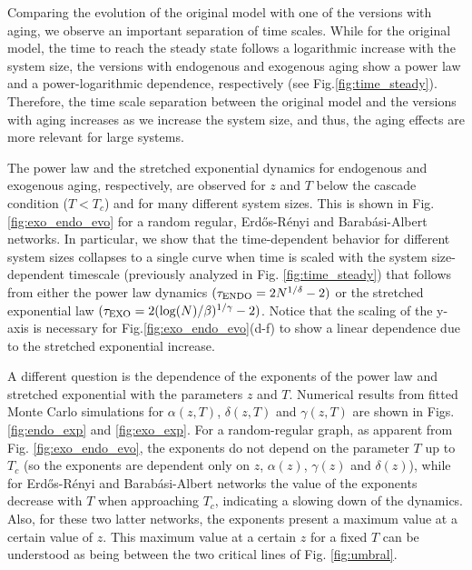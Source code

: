 Comparing the evolution of the original model with one of the versions with aging, we observe an important separation of time scales. While for the original model, the time to reach the steady state follows a logarithmic increase with the system size, the versions with endogenous and exogenous aging show a power law and a power-logarithmic dependence, respectively (see Fig.\ref{fig:time_steady}). Therefore, the time scale separation between the original model and the versions with aging increases as we increase the system size, and thus, the aging effects are more relevant for large systems.

The power law and the stretched exponential dynamics for endogenous and exogenous aging, respectively, are observed for $z$ and $T$ below the cascade condition ($T < T_c$) and for many different system sizes. This is shown in Fig. \ref{fig:exo_endo_evo} for a random regular, Erd\H{o}s-R\'enyi and  Barab\'asi-Albert networks. In particular, we show that the time-dependent behavior for different system sizes collapses to a single curve when time is scaled with the system size-dependent timescale (previously analyzed in Fig. \ref{fig:time_steady}) that follows from either the power law dynamics $(\tau_{\rm{ENDO}} = 2N^{1/\delta} - 2)$  or the stretched exponential law  $(\tau_{\rm{EXO}} = 2( \log(N)/\beta )^{1/\gamma} - 2)$. Notice that the scaling of the y-axis is necessary for Fig.\ref{fig:exo_endo_evo}(d-f) to show a linear dependence due to the stretched exponential increase.


A different question is the dependence of the exponents of the power law and stretched exponential with the parameters $z$ and $T$. Numerical results from fitted Monte Carlo simulations for $\alpha(z,T)$, $\delta(z,T)$ and $\gamma(z,T)$ are shown in Figs. \ref{fig:endo_exp} and \ref{fig:exo_exp}. For a random-regular graph, as apparent from Fig. \ref{fig:exo_endo_evo}, the exponents do not depend on the parameter $T$ up to $T_c$ (so the exponents are dependent only on $z$, $\alpha(z)$, $\gamma(z)$ and $\delta(z)$), while for Erd\H{o}s-R\'enyi and Barab\'asi-Albert networks the value of the exponents decrease with $T$ when approaching $T_c$, indicating a slowing down of the dynamics. Also, for these two latter networks, the exponents present a maximum value at a certain value of $z$. This maximum value at a certain $z$ for a fixed $T$ can be understood as being between the two critical lines of Fig. \ref{fig:umbral}.

